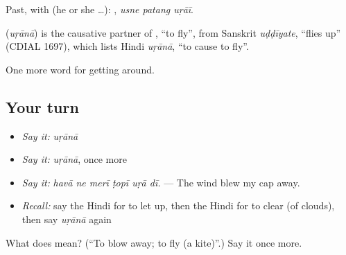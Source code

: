 Past, with  (he or she …):   , \emph{usne patang uṛāī}.

\begin{cousinweb}
\textbf{} (\emph{uṛānā}) is the causative partner of , \textquotedblleft{}to fly\textquotedblright{}, from Sanskrit \emph{uḍḍīyate}, \textquotedblleft{}flies up\textquotedblright{} (CDIAL 1697), which lists Hindi \emph{uṛānā}, \textquotedblleft{}to cause to fly\textquotedblright{}.
\end{cousinweb}

\begin{grammarlens}[title={What you've built}]
One more word for getting around.
\end{grammarlens}

\subsection*{Your turn}
\begin{itemize}
\raggedright
  \item \emph{Say it:} \emph{uṛānā}
  \item \emph{Say it:} \emph{uṛānā}, once more
  \item \emph{Say it:} \emph{havā ne merī ṭopī uṛā dī.} — The wind blew my cap away.
  \item \emph{Recall:} say the Hindi for to let up, then the Hindi for to clear (of clouds), then say \emph{uṛānā} again
\end{itemize}

\begin{tcolorbox}[breakable,colback=teal!4,colframe=teal!35!black,title={Before you move on}]
What does  mean? (\textquotedblleft{}To blow away; to fly (a kite)\textquotedblright{}.) Say it once more.
\end{tcolorbox}
